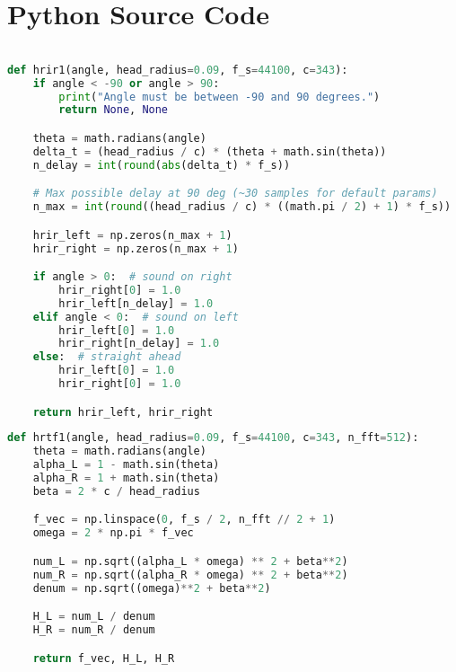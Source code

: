 \chapter{Python Source Code}

\begin{lstlisting}[language=Python, caption={hrir.py}, label={lst:hrir}]

def hrir1(angle, head_radius=0.09, f_s=44100, c=343):
    if angle < -90 or angle > 90:
        print("Angle must be between -90 and 90 degrees.")
        return None, None

    theta = math.radians(angle)
    delta_t = (head_radius / c) * (theta + math.sin(theta))
    n_delay = int(round(abs(delta_t) * f_s))

    # Max possible delay at 90 deg (~30 samples for default params)
    n_max = int(round((head_radius / c) * ((math.pi / 2) + 1) * f_s))

    hrir_left = np.zeros(n_max + 1)
    hrir_right = np.zeros(n_max + 1)

    if angle > 0:  # sound on right
        hrir_right[0] = 1.0
        hrir_left[n_delay] = 1.0
    elif angle < 0:  # sound on left
        hrir_left[0] = 1.0
        hrir_right[n_delay] = 1.0
    else:  # straight ahead
        hrir_left[0] = 1.0
        hrir_right[0] = 1.0

    return hrir_left, hrir_right


\end{lstlisting}

\begin{lstlisting}[language=Python, caption={hrtf.py}, label={lst:hrtf}]
def hrtf1(angle, head_radius=0.09, f_s=44100, c=343, n_fft=512):
    theta = math.radians(angle)
    alpha_L = 1 - math.sin(theta)
    alpha_R = 1 + math.sin(theta)
    beta = 2 * c / head_radius

    f_vec = np.linspace(0, f_s / 2, n_fft // 2 + 1)
    omega = 2 * np.pi * f_vec

    num_L = np.sqrt((alpha_L * omega) ** 2 + beta**2)
    num_R = np.sqrt((alpha_R * omega) ** 2 + beta**2)
    denum = np.sqrt((omega)**2 + beta**2)

    H_L = num_L / denum
    H_R = num_R / denum

    return f_vec, H_L, H_R
\end{lstlisting}

